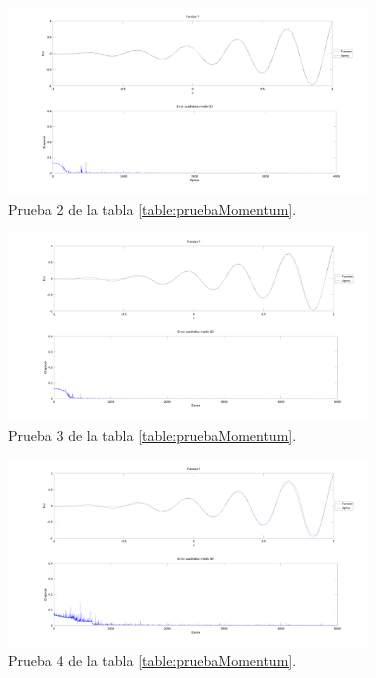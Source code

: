 \documentclass[11pt,a4paper]{article}
\begin{document}
{\begin{figure}[ht]
\centering
\includegraphics[width=0.85\textwidth]{img/PruebaRecu25.png}
\caption{\label{fig:pruebaRecu25} Prueba 2 de la tabla \ref{table:pruebaMomentum}.}
\end{figure}

\begin{figure}[ht]
\centering
\includegraphics[width=0.85\textwidth]{img/PruebaRecu26.png}
\caption{\label{fig:pruebaRecu26} Prueba 3 de la tabla \ref{table:pruebaMomentum}.}
\end{figure}

\clearpage


\begin{figure}[ht]
\centering
\includegraphics[width=0.85\textwidth]{img/PruebaRecu27.png}
\caption{\label{fig:pruebaRecu27} Prueba 4 de la tabla \ref{table:pruebaMomentum}.}
\end{figure}


}
\end{document}
